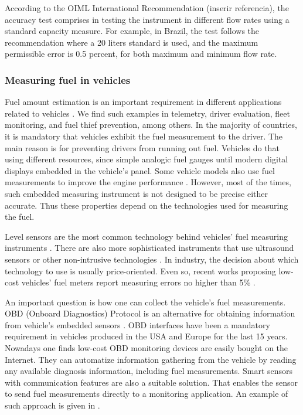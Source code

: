 \documentclass[sigplan]{acmart}
\begin{document}
According to the OIML International Recommendation (inserir referencia), the accuracy test comprises in testing the instrument in different flow rates using a standard capacity measure. For example, in Brazil, the test follows the recommendation where a 20 liters standard is used, and the maximum permissible error is 0.5 percent, for both maximum and minimum flow rate.


\subsubsection{Measuring fuel in vehicles}
Fuel amount estimation is an important requirement in different applications related to vehicles \cite{Skog2014,Obikoya2014,Andria2016,Kumar2017,Ahmed2017,Patil2017}.
We find such examples in telemetry, driver evaluation, fleet monitoring, and fuel thief prevention, among others.
In the majority of countries, it is mandatory that vehicles exhibit the fuel measurement to the driver.
The main reason is for preventing drivers from running out fuel.
Vehicles do that using different resources, since simple analogic fuel gauges until modern digital displays embedded in the vehicle's panel.
Some vehicle models also use fuel measurements to improve the engine performance \cite{Skog2014}.
However, most of the times, such embedded measuring instrument is not designed to be precise either accurate.
Thus these properties depend on the technologies used for measuring the fuel.

Level sensors are the most common technology behind vehicles' fuel measuring instruments \cite{Obikoya2014}.
There are also more sophisticated instruments that use ultrasound sensors or other non-intrusive technologies \cite{Ahmed2017,Patil2017}.
In industry, the decision about which technology to use is usually price-oriented.
Even so, recent works proposing low-cost vehicles' fuel meters report measuring errors no higher than 5\% \cite{Obikoya2014,Ahmed2017,Kumar2017,Patil2017}.

An important question is how one can collect the vehicle's fuel measurements.
OBD (Onboard Diagnostics) Protocol is an alternative for obtaining information from vehicle's embedded sensors \cite{Andria2016}.
OBD interfaces have been a mandatory requirement in vehicles produced in the USA and Europe for the last 15 years.
Nowadays one finds low-cost OBD monitoring devices are easily bought on the Internet. 
They can automatize information gathering from the vehicle by reading any available diagnosis information, including fuel measurements.
Smart sensors with communication features are also a suitable solution.
That enables the sensor to send fuel measurements directly to a monitoring application.
An example of such approach is given in \cite{Ahmed2017}.
\end{document}
